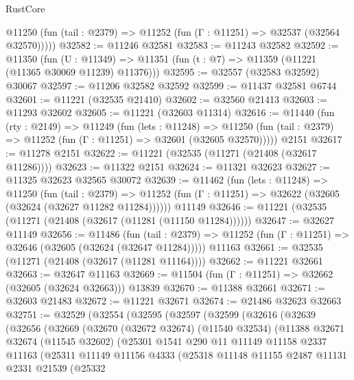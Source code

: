 \begin{lexlean}{RustCore}
\begin{coremodule}
      @11250 (fun (tail : @2379) => @11252 (fun (Γ : @11251) => @32537 (@32564 @32570)))))
@32582 := @11246 @32581
@32583 := @11243 @32582
@32592 := @11350
    (fun (U : @11349) => @11351 (fun (t : @7) => @11359 (@11221 (@11365 @30069 @11239) @11376)))
@32595 := @32557 (@32583 @32592) @30067
@32597 := @11206 @32582 @32592
@32599 := @11437 @32581 @6744
@32601 := @11221 (@32535 @21410)
@32602 := @32560 @21413
@32603 := @11293 @32602
@32605 := @11221 (@32603 @11314)
@32616 := @11440
    (fun (rty : @2149) =>
    @11249
      (fun (lets : @11248) =>
      @11250 (fun (tail : @2379) => @11252 (fun (Γ : @11251) => @32601 (@32605 @32570)))))
    @2151
@32617 := @11278 @2151
@32622 := @11221 (@32535 (@11271 (@21408 (@32617 @11286))))
@32623 := @11322 @2151
@32624 := @11321 @32623
@32627 := @11325 @32623 @32565 @30072
@32639 := @11462
    (fun (lets : @11248) =>
    @11250
      (fun (tail : @2379) =>
      @11252 (fun (Γ : @11251) => @32622 (@32605 (@32624 (@32627 @11282 @11284))))))
    @11149
@32646 := @11221 (@32535 (@11271 (@21408 (@32617 (@11281 (@11150 @11284))))))
@32647 := @32627 @11149
@32656 := @11486
    (fun (tail : @2379) => @11252 (fun (Γ : @11251) => @32646 (@32605 (@32624 (@32647 @11284)))))
    @11163
@32661 := @32535 (@11271 (@21408 (@32617 (@11281 @11164))))
@32662 := @11221 @32661
@32663 := @32647 @11163
@32669 := @11504 (fun (Γ : @11251) => @32662 (@32605 (@32624 @32663))) @13839
@32670 := @11388 @32661
@32671 := @32603 @21483
@32672 := @11221 @32671
@32674 := @21486 @32623 @32663
@32751 := @32529
    (@32554
      (@32595
        (@32597
          (@32599
            (@32616
              (@32639
                (@32656
                  (@32669
                    (@32670
                      (@32672 @32674)
                      (@11540 @32534)
                      (@11388
                        @32671
                        @32674
                        (@11545 @32602)
                        (@25301
                          @1541
                          @290
                          @11
                          @11149
                          @11158
                          @2337
                          @11163
                          (@25311
                            @11149
                            @11156
                            @4333
                            (@25318
                              @11148
                              @11155
                              @2487
                              @11131
                              @2331
                              @21539
                              (@25332

\end{coremodule}
\end{lexlean}
